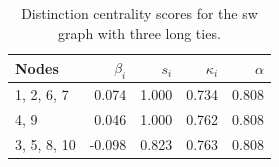 \begin{table}
\centering
\caption{\label{tab:sw3}Distinction centrality scores for the sw graph with three long ties.}
\centering
\begin{tabular}[t]{lrrrr}
\toprule
Nodes & $\beta_i$ & $s_i$ & $\kappa_i$ & $\alpha$\\
\midrule
1, 2, 6, 7 & 0.074 & 1.000 & 0.734 & 0.808\\
4, 9 & 0.046 & 1.000 & 0.762 & 0.808\\
3, 5, 8, 10 & -0.098 & 0.823 & 0.763 & 0.808\\
\bottomrule
\end{tabular}
\end{table}

